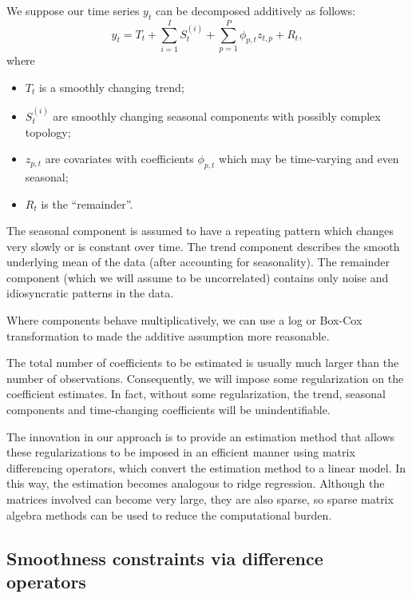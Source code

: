 \documentclass[ijds,nonblindrev]{informs-ijds}
\providecommand{\tightlist}{%
  \setlength{\itemsep}{0pt}\setlength{\parskip}{0pt}}
\begin{document}
We suppose our time series \(y_{t}\) can be decomposed additively as follows:
\begin{equation}
  \label{STR:many_parts}
  y_{t} = T_{t} + \sum_{i=1}^{I} S^{(i)}_{t} + \sum_{p=1}^P \phi_{p,t} z_{t,p} + R_{t} ,
\end{equation}
where

\begin{itemize}
\tightlist
\item
  \(T_{t}\) is a smoothly changing trend;
\item
  \(S^{(i)}_{t}\) are smoothly changing seasonal components with possibly complex topology;
\item
  \(z_{p,t}\) are covariates with coefficients \(\phi_{p,t}\) which may be time-varying and even seasonal;
\item
  \(R_{t}\) is the ``remainder''.
\end{itemize}

The seasonal component is assumed to have a repeating pattern which changes very slowly or is constant over time. The trend component describes the smooth underlying mean of the data (after accounting for seasonality). The remainder component (which we will assume to be uncorrelated) contains only noise and idiosyncratic patterns in the data.

Where components behave multiplicatively, we can use a log or Box-Cox transformation \citep{BC64} to made the additive assumption more reasonable.

The total number of coefficients to be estimated is usually much larger than the number of observations. Consequently, we will impose some regularization on the coefficient estimates. In fact, without some regularization, the trend, seasonal components and time-changing coefficients will be unindentifiable.

The innovation in our approach is to provide an estimation method that allows these regularizations to be imposed in an efficient manner using matrix differencing operators, which convert the estimation method to a linear model. In this way, the estimation becomes analogous to ridge regression. Although the matrices involved can become very large, they are also sparse, so sparse matrix algebra methods can be used to reduce the computational burden.

\hypertarget{smoothness-constraints-via-difference-operators}{%
\subsection{Smoothness constraints via difference operators}\label{smoothness-constraints-via-difference-operators}}
\end{document}
